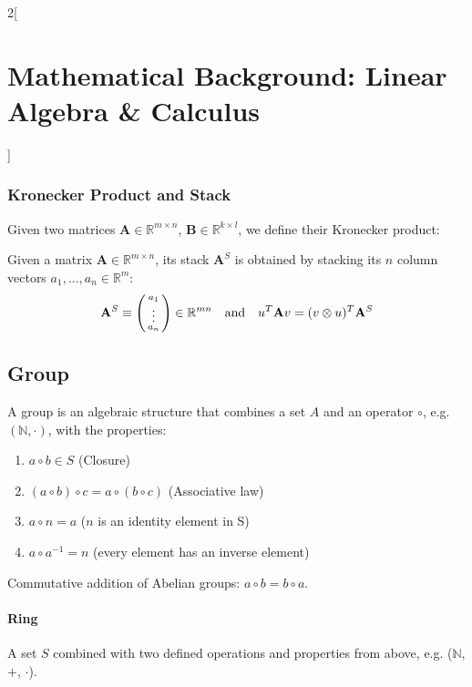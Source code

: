 \documentclass[oneside,fontsize=11pt,paper=a4]{scrartcl}
\newcommand{\A}[5]{\left#1\begin{array}{ccc}
{#2}_{11}\mathbf{B} & \cdots & {#2}_{1#4}\mathbf{B}\\
\vdots & \ddots & \vdots\\
{#2}_{#31}\mathbf{B} & \cdots & {#2}_{#3#4}\mathbf{B}
\end{array}\right#5}
\begin{document}
\begin{multicols}{2}[\section{Mathematical Background: Linear Algebra \& Calculus}]
\subsubsection{Kronecker Product and Stack}
Given two matrices $\mathbf{A} \in \mathbb{R}^{m \times n}$, $\mathbf{B} \in \mathbb{R}^{k \times l}$, we define their Kronecker product:

Given a matrix $\mathbf{A} \in \mathbb{R}^{m \times n}$, its stack $\mathbf{A}^S$ is obtained by stacking its $n$ column vectors $a_1, ..., a_n \in \mathbb{R}^{m}$:
\begin{equation*}
	\mathbf{A}^S \equiv 
	\begin{psmallmatrix}
		a_1 \\
		\vdots \\
		a_n \\
	\end{psmallmatrix}	
	\in \mathbb{R}^{mn}
    \quad\text{and}\quad
    u^T \mathbf{A} v = (v \otimes u)^T \mathbf{A}^S
\end{equation*}

\subsection{Group}
A group is an algebraic structure that combines a set $A$ and an operator $\circ$, e.g. $(\mathbb{N},\cdot)$, with the properties:
\begin{enumerate}
    \setlength\itemsep{-0.1em}
	\item $a \circ b \in S$ (Closure)
	\item $(a \circ b) \circ c = a \circ (b \circ c)$ (Associative law)
	\item $a \circ n = a$ ($n$ is an identity element in S)
	\item $a \circ a^{-1} = n$ (every element has an inverse element)
\end{enumerate}

Commutative addition of Abelian groups: $a \circ b = b \circ a$.

\paragraph{Ring} A set $S$ combined with two defined operations and properties from above, e.g. ($\mathbb{N}$, $+$, $\cdot$).


\end{multicols}
\end{document}
